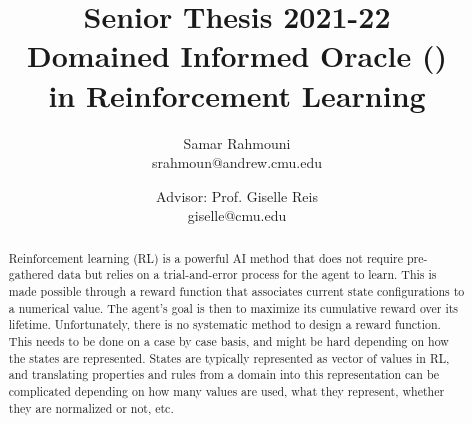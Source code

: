 \documentclass[a4paper,11pt]{article}
\author{%
  \begin{minipage}[t]{0.47\textwidth}
    \centering
    Samar Rahmouni \\ srahmoun@andrew.cmu.edu
  \end{minipage}
  \and
  \begin{minipage}[t]{0.45\textwidth}
    \centering
    Advisor: Prof. Giselle Reis \\ giselle@cmu.edu
  \end{minipage}%
  \vspace*{2ex}
}
\date{}
\title{{\Large\sc Senior Thesis 2021-22\\[2ex]}{\LARGE\bf Domained
Informed Oracle (\dio{})\\ in Reinforcement Learning}\\}
\theoremstyle{definition}
\begin{document}
\maketitle 

\begin{abstract} 


  Reinforcement learning (RL) is a powerful AI method that does not
  require pre-gathered data but relies on a trial-and-error process
  for the agent to learn. 
  This is made possible through a reward function that associates
  current state configurations to a numerical value. 
  The agent's goal is then to maximize its cumulative reward over its
  lifetime. 
  Unfortunately, there is no systematic method to design a reward
  function.
  This needs to be done on a case by case basis, and might be hard
  depending on how the states are represented.
  States are typically represented as vector of values in RL, and
  translating properties and rules from a domain into this
  representation can be complicated depending on how many values are
  used, what they represent, whether they are normalized or not, etc.






\end{abstract}
\end{document}

